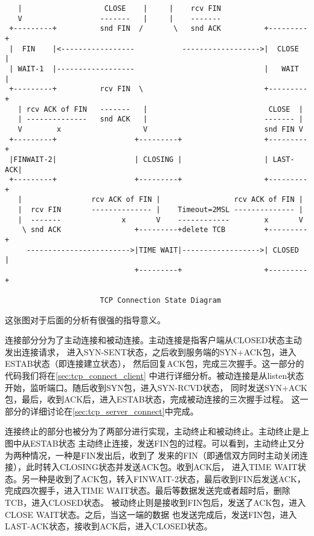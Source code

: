 \begin{verbatim}
   |                   CLOSE    |     |    rcv FIN                     
   V                  -------   |     |    -------                     
 +---------+          snd FIN  /       \   snd ACK          +---------+
 |  FIN    |<-----------------           ------------------>|  CLOSE  |
 | WAIT-1  |------------------                              |   WAIT  |
 +---------+          rcv FIN  \                            +---------+
   | rcv ACK of FIN   -------   |                            CLOSE  |  
   | --------------   snd ACK   |                           ------- |  
   V        x                   V                           snd FIN V  
 +---------+                  +---------+                   +---------+
 |FINWAIT-2|                  | CLOSING |                   | LAST-ACK|
 +---------+                  +---------+                   +---------+
   |                rcv ACK of FIN |                 rcv ACK of FIN |  
   |  rcv FIN       -------------- |    Timeout=2MSL -------------- |  
   |  -------              x       V    ------------        x       V  
    \ snd ACK                 +---------+delete TCB         +---------+
     ------------------------>|TIME WAIT|------------------>| CLOSED  |
                              +---------+                   +---------+

                      TCP Connection State Diagram
\end{verbatim}
这张图对于后面的分析有很强的指导意义。

连接部分分为了主动连接和被动连接。主动连接是指客户端从CLOSED状态主动发出连接请求，
进入SYN-SENT状态，之后收到服务端的SYN+ACK包，进入ESTAB状态（即连接建立状态），
然后回复ACK包，完成三次握手。这一部分的代码我们将在\ref{sec:tcp_connect_client}
中进行详细分析。被动连接是从listen状态开始，监听端口。随后收到SYN包，进入SYN-RCVD状态，
同时发送SYN+ACK包，最后，收到ACK后，进入ESTAB状态，完成被动连接的三次握手过程。
这一部分的详细讨论在\ref{sec:tcp_server_connect}中完成。

连接终止的部分也被分为了两部分进行实现，主动终止和被动终止。主动终止是上图中从ESTAB状态
主动终止连接，发送FIN包的过程。可以看到，主动终止又分为两种情况，一种是FIN发出后，收到了
发来的FIN（即通信双方同时主动关闭连接），此时转入CLOSING状态并发送ACK包。收到ACK后，
进入TIME WAIT状态。另一种是收到了ACK包，转入FINWAIT-2状态，最后收到FIN后发送ACK，
完成四次握手，进入TIME WAIT状态。最后等数据发送完或者超时后，删除TCB，进入CLOSED状态。
被动终止则是接收到FIN包后，发送了ACK包，进入CLOSE WAIT状态。之后，当这一端的数据
也发送完成后，发送FIN包，进入LAST-ACK状态，接收到ACK后，进入CLOSED状态。

